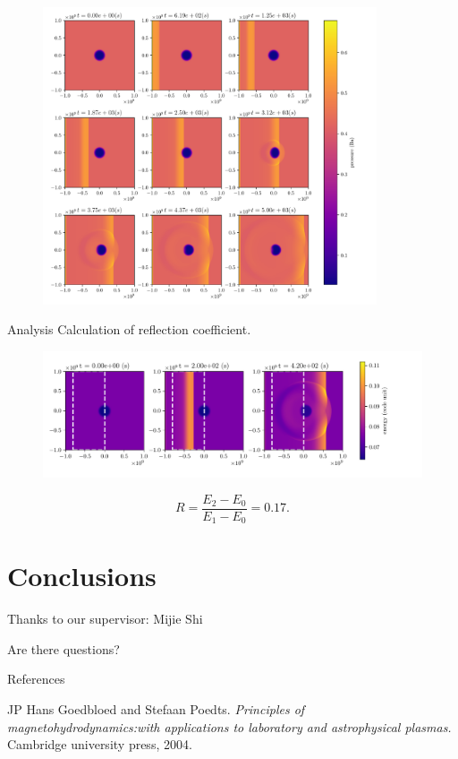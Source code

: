 \documentclass{beamer}
\begin{document}
\begin{frame}
	\begin{figure}[h]
		\centering
		\includegraphics[width=0.88\textwidth]{../report/figures/hole_time.pdf}
	\end{figure}
\end{frame}
\begin{frame}{Analysis}
	Calculation of reflection coefficient.
	\begin{figure}[h]
		\centering
		\includegraphics[width=1.1\textwidth]{figures/reflection_coefficient.pdf}
	\end{figure}	
	\[
	R = \frac{E_2 - E_0}{E_1 - E_0} = 0.17
	.\] 
\end{frame}
\section{Conclusions}
\begin{frame}
Thanks to our supervisor: Mijie Shi

\bigskip

Are there questions?
\end{frame}
\begin{frame}{References}
    \begin{itemize}\footnotesize{
        \item JP Hans Goedbloed and Stefaan Poedts. \textit{Principles of magnetohydrodynamics:with applications to laboratory and astrophysical plasmas.} Cambridge university press, 2004.
    }
    \end{itemize}
    \printbibliography
\end{frame}
\end{document}
